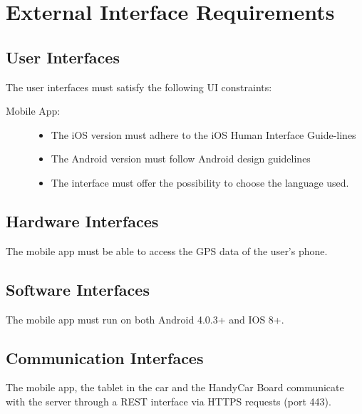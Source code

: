 \section{External Interface Requirements}

\subsection{User Interfaces}
The user interfaces must satisfy the following UI constraints:
\begin{description}
\item[Mobile App:]
	\begin{itemize}
	\item The iOS version must adhere to the iOS Human Interface Guide-lines
	\item The Android version must follow Android design guidelines
	\item The interface must oﬀer the possibility to choose the language used.
	\end{itemize}
\end{description}

\subsection{Hardware Interfaces}
The mobile app must be able to access the GPS data of the user’s phone.
\subsection{Software Interfaces}
The mobile app must run on both Android 4.0.3+ and IOS 8+.
\subsection{Communication Interfaces}
The mobile app, the tablet in the car and the HandyCar Board communicate with the server through a REST interface via HTTPS requests (port 443).
